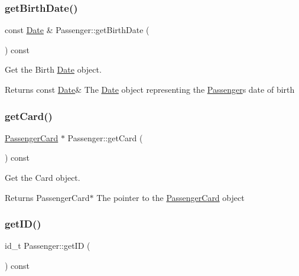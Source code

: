 \subsubsection{\texorpdfstring{get\+Birth\+Date()}{getBirthDate()}}
{\footnotesize\ttfamily const \mbox{\hyperlink{classDate}{Date}} \& Passenger\+::get\+Birth\+Date (\begin{DoxyParamCaption}{ }\end{DoxyParamCaption}) const}



Get the Birth \mbox{\hyperlink{classDate}{Date}} object. 

\begin{DoxyReturn}{Returns}
const \mbox{\hyperlink{classDate}{Date}}\& The \mbox{\hyperlink{classDate}{Date}} object representing the \mbox{\hyperlink{classPassenger}{Passenger}}\textquotesingle{}s date of birth 
\end{DoxyReturn}
\mbox{\label{classPassenger_ae8d5310db80438702dec5f4d649289f1}} 
\subsubsection{\texorpdfstring{get\+Card()}{getCard()}}
{\footnotesize\ttfamily \mbox{\hyperlink{classPassengerCard}{Passenger\+Card}} $\ast$ Passenger\+::get\+Card (\begin{DoxyParamCaption}{ }\end{DoxyParamCaption}) const}



Get the Card object. 

\begin{DoxyReturn}{Returns}
Passenger\+Card$\ast$ The pointer to the \mbox{\hyperlink{classPassengerCard}{Passenger\+Card}} object 
\end{DoxyReturn}
\mbox{\label{classPassenger_ae6fcc19037be144f654c623c5b78ae24}} 
\subsubsection{\texorpdfstring{get\+I\+D()}{getID()}}
{\footnotesize\ttfamily id\+\_\+t Passenger\+::get\+ID (\begin{DoxyParamCaption}{ }\end{DoxyParamCaption}) const}



